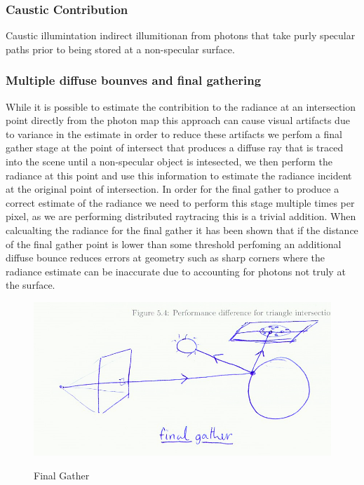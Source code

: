 
\subsubsection{Caustic Contribution}
Caustic illumintation indirect illumitionan from photons that take purly specular paths prior to being stored at a non-specular
surface.

\subsubsection{Multiple diffuse bounves and final gathering}

While it is possible to estimate the contribition to the radiance at an intersection point directly from the photon map this
approach can cause visual artifacts due to variance in the estimate in order to reduce these artifacts we perfom a final gather
stage at the point of intersect that produces a diffuse ray that is traced into the scene until a non-specular object is intesected,
we then perform the radiance at this point and use this information to estimate the radiance incident at the original point of intersection.
In order for the final gather to produce a correct estimate of the radiance we need to perform this stage multiple times per pixel, as we
are performing distributed raytracing this is a trivial addition. When calcualting the radiance for the final gather it has been shown 
that if the distance of the final gather point is lower than some threshold perfoming an additional diffuse bounce reduces errors at geometry
such as sharp corners where the radiance estimate can be inaccurate due to accounting for photons not truly at the surface.

\begin{figure}
\centering
\includegraphics[width=\textwidth]{./images/final_gather.png}
\label{fig:final_gather}
\caption{Final Gather}
\end{figure}

